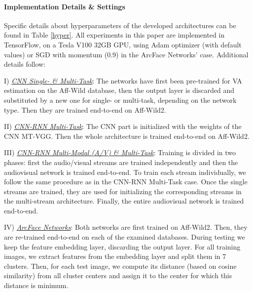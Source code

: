 \documentclass{bmvc2k}
\begin{document}
\paragraph{Implementation Details \& Settings}
Specific details about hyperparameters of the developed architectures can be found in Table \ref{hyper}.  All experiments in this paper are implemented in TensorFlow, on a Tesla V100 32GB GPU, using Adam optimizer (with default values) or SGD with momentum (0.9) in the ArcFace Networks' case. Additional details follow:

\noindent I) \underline{\textit{CNN Single- \& Multi-Task}}: The networks have first been pre-trained for VA estimation on the Aff-Wild database, then the output layer is discarded and substituted by a new one for single- or multi-task, depending on the network type. Then they are trained end-to-end on Aff-Wild2. 

\noindent II) \underline{\textit{CNN-RNN Multi-Task}}: The CNN part is initialized with the weights of the CNN MT-VGG. Then the whole architecture is trained end-to-end on Aff-Wild2. 

\noindent III) \underline{\textit{CNN-RNN Multi-Modal (A/V) \& Multi-Task}}: Training is divided in two phases: first the audio/visual streams are trained independently and then the audiovisual network is trained end-to-end. To train each stream individually, we follow the same procedure as in the CNN-RNN Multi-Task case. Once the single streams are trained, they are used for initializing the corresponding streams in the multi-stream architecture. Finally, the entire audiovisual network is trained end-to-end. 

\noindent IV) \underline{\textit{ArcFace Networks}}: Both networks are first trained on Aff-Wild2. Then, they are re-trained end-to-end on each of the examined databases. During testing we keep the feature embedding layer, discarding the output layer. For all training images, we extract features from the embedding layer and split them in 7 clusters. Then, for each test image, we compute its distance (based on cosine similarity) from all cluster centers and assign it to the center for which this distance is minimum. 
\end{document}
